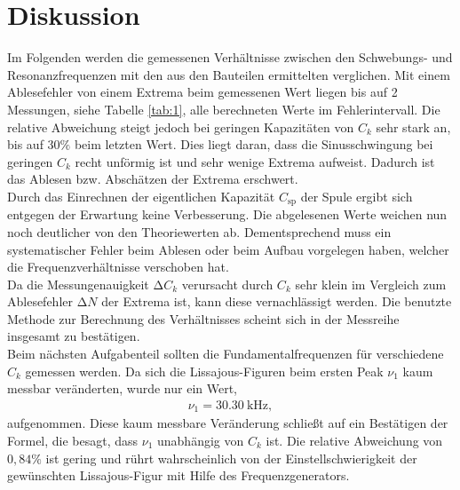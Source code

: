 \section{Diskussion}
\label{sec:Diskussion}
Im Folgenden werden die gemessenen Verhältnisse zwischen den Schwebungs- und Resonanzfrequenzen mit den aus den Bauteilen ermittelten verglichen.
Mit einem Ablesefehler von einem Extrema beim gemessenen Wert liegen bis auf 2 Messungen, siehe Tabelle \ref{tab:1}, alle berechneten Werte im Fehlerintervall.
Die relative Abweichung steigt jedoch bei geringen Kapazitäten von $C_k$ sehr stark an, bis auf $30\%$ beim letzten Wert.
Dies liegt daran, dass die Sinusschwingung bei geringen $C_k$ recht unförmig ist und sehr wenige Extrema aufweist.
Dadurch ist das Ablesen bzw. Abschätzen der Extrema erschwert.\\
Durch das Einrechnen der eigentlichen Kapazität $C_{\text{sp}}$ der Spule ergibt sich entgegen der Erwartung keine Verbesserung.
Die abgelesenen Werte weichen nun noch deutlicher von den Theoriewerten ab.
Dementsprechend muss ein systematischer Fehler beim Ablesen oder beim Aufbau vorgelegen haben, welcher die Frequenzverhältnisse verschoben hat. \\
Da die Messungenauigkeit $\increment C_k$ verursacht durch $C_k$ sehr klein im Vergleich zum Ablesefehler $\increment N$ der Extrema ist, kann diese vernachlässigt werden.
Die benutzte Methode zur Berechnung des Verhältnisses scheint sich in der Messreihe insgesamt zu bestätigen.\\
Beim nächsten Aufgabenteil sollten die Fundamentalfrequenzen für verschiedene $C_k$ gemessen werden.
Da sich die Lissajous-Figuren beim ersten Peak $\nu_1$ kaum messbar veränderten, wurde nur ein Wert,
\begin{align*}
  \nu_1 = \SI{30.30}{\kilo\hertz},
\end{align*}
aufgenommen.
Diese kaum messbare Veränderung schließt auf ein Bestätigen der Formel, die besagt, dass $\nu_1$ unabhängig von $C_k$ ist.
Die relative Abweichung von $0,84\%$ ist gering und rührt wahrscheinlich von der Einstellschwierigkeit der gewünschten Lissajous-Figur mit Hilfe des Frequenzgenerators.
